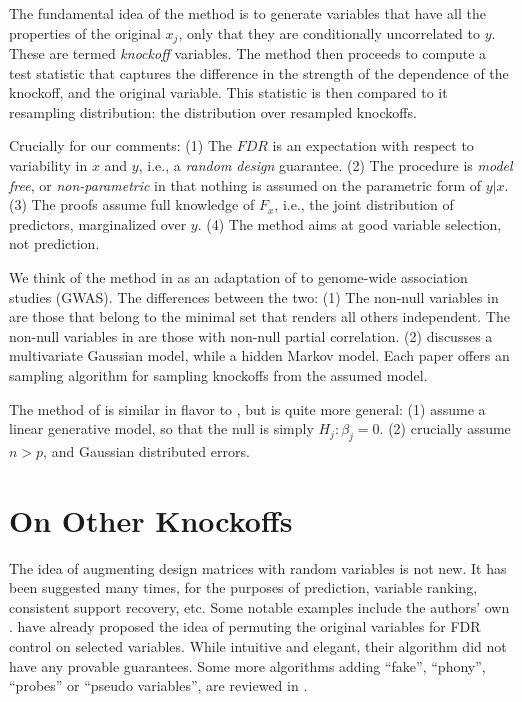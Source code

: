 \documentclass[article,lineno]{biometrika}
\begin{document}
The fundamental idea of the method is to generate variables that have all the properties of the original $x_j$, only that they are conditionally uncorrelated to $y$. 
These are termed \emph{knockoff} variables. 
The method then proceeds to compute a test statistic that captures the difference in the strength of the dependence of the knockoff, and the original variable. 
This statistic is then compared to it resampling distribution: the distribution over resampled knockoffs. 

Crucially for our comments:
(1) The $FDR$ is an expectation with respect to variability in $x$ and $y$, i.e., a \emph{random design} guarantee. 
(2) The procedure is \emph{model free}, or \emph{non-parametric} in that nothing is assumed on the parametric form of $y|x$. 
(3) The proofs assume full knowledge of $F_x$, i.e., the joint distribution of predictors, marginalized over $y$.
(4) The method aims at good variable selection, not prediction. 

We think of the method in \cite{SesiaGenehuntinghidden} as an adaptation of \cite{CandesPanninggoldmodelX2018} to genome-wide association studies (GWAS).
The differences between the two:
(1) The non-null variables in \cite{CandesPanninggoldmodelX2018} are those that belong to the minimal set that renders all others independent. The non-null variables in \cite{SesiaGenehuntinghidden} are those with non-null partial correlation. 
(2) \cite{CandesPanninggoldmodelX2018} discusses a multivariate Gaussian model, while \cite{SesiaGenehuntinghidden} a hidden Markov model. 
Each paper offers an sampling algorithm for sampling knockoffs from the assumed model. 

The method of \cite{SesiaGenehuntinghidden} is similar in flavor to \cite{BarberControllingfalsediscovery2015}, but \cite{SesiaGenehuntinghidden} is quite more general:
(1) \cite{BarberControllingfalsediscovery2015} assume a linear generative model, so that the null is simply $H_j:\beta_j=0$. 
(2) \cite{BarberControllingfalsediscovery2015} crucially assume $n>p$, and Gaussian distributed errors. 




\section{On Other Knockoffs}
The idea of augmenting design matrices with random variables is not new. 
It has been suggested many times, for the purposes of prediction, variable ranking, consistent support recovery, etc. 
Some notable examples include the authors' own \cite{candes2006robust}.
\cite{TusherSignificanceanalysismicroarrays2001} have already proposed the idea of permuting the original variables for FDR control on selected variables.
While intuitive and elegant, their algorithm did not have any provable guarantees. 
Some more algorithms adding ``fake'', ``phony'', ``probes'' or ``pseudo variables'', are reviewed in \cite{GuyonIntroductionVariableFeature2003}.
\end{document}
